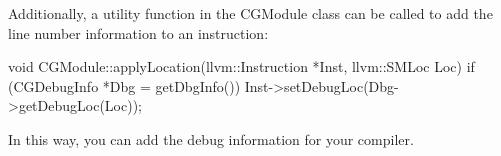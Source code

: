 Additionally, a utility function in the CGModule class can be called to add the line number information to an instruction:

\begin{cpp}
void CGModule::applyLocation(llvm::Instruction *Inst,
                             llvm::SMLoc Loc) {
    if (CGDebugInfo *Dbg = getDbgInfo())
        Inst->setDebugLoc(Dbg->getDebugLoc(Loc));
}
\end{cpp}

In this way, you can add the debug information for your compiler.





































